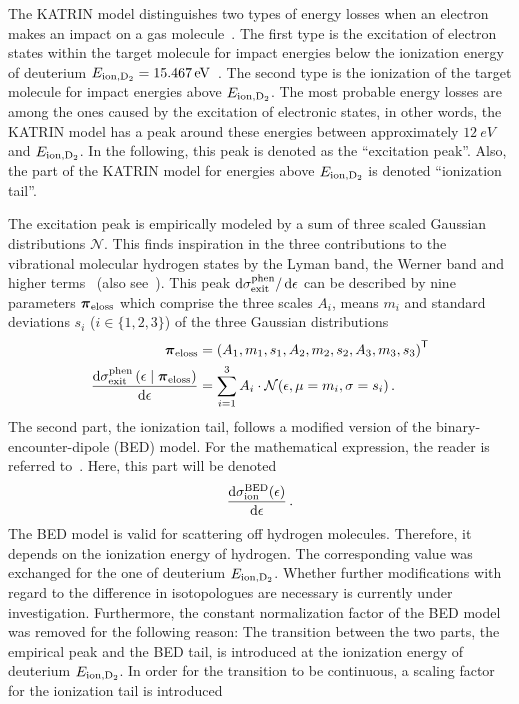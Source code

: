 The KATRIN model distinguishes two types of energy losses when an electron makes an impact on a gas molecule~\cite{Hannen2019_2}. The first type is the excitation of electron states within the target molecule for impact energies below the ionization energy of deuterium $E_\mathrm{ion,D_2}=\SI{15.467}{eV}$~\cite{Shiner1993}. The second type is the ionization of the target molecule for impact energies above $E_\mathrm{ion,D_2}$. The most probable energy losses are among the ones caused by the excitation of electronic states, in other words, the KATRIN model has a peak around these energies between approximately $\SI{12}{eV}$ and $E_\mathrm{ion,D_2}$. In the following, this peak is denoted as the ``excitation peak''. Also, the part of the KATRIN model for energies above $E_\mathrm{ion,D_2}$ is denoted ``ionization tail''.

The excitation peak is empirically modeled by a sum of three scaled Gaussian distributions $\mathcal{N}$. This finds inspiration in the three contributions to the vibrational molecular hydrogen states by the Lyman band, the Werner band and higher terms~\cite{Hannen2019_1} (also see~\cite{Geiger1964}). This peak $\mathop{}\!\mathrm{d}\sigma_\mathrm{exit}^\mathrm{phen}/\mathop{}\!\mathrm{d} \epsilon$  can be described by nine parameters $\boldsymbol{\mathbf{\pi}}_\mathrm{eloss}$ which comprise the three scales $A_i$, means $m_i$ and standard deviations $s_i$ ($i \in \{1,2,3\}$) of the three Gaussian distributions~\cite{Hannen2019_2}
\newcommand{\katrinElossPhen}[1]{
	\frac{
		\d\sigma_\mathrm{exit}^\mathrm{phen}\giventhat*{#1}{\nuisanceParamVec_\mathrm{eloss}}
	}{
		\d \epsilon
	}
}
\begin{align}
\label{eq:katrinElossElossModelParams}
\nuisanceParamVec_\mathrm{eloss} &= 
\transp{\left(
	A_1, m_1, s_1, 
	A_2, m_2, s_2, 
	A_3, m_3, s_3
	\right)} \\
\katrinElossPhen{\epsilon} &=
\sum_{i=1}^3 A_i \cdot \mathcal{N}(\epsilon, \mu=m_i, \sigma=s_i)
\fullstop
\end{align}
The second part, the ionization tail, follows a modified version of the binary-encounter-dipole (BED) model. For the mathematical expression, the reader is referred to~\cite{Kim1994}. Here, this part will be denoted
\newcommand{\katrinElossBDE}[1]{
	\frac{
		\d \sigma_\mathrm{ion}^\mathrm{BED}(#1)
	}{
		\d \epsilon
	}
}%
\begin{equation}
	\katrinElossBDE{\epsilon}
	\fullstop
\end{equation}%
The BED model is valid for scattering off hydrogen molecules. Therefore, it depends on the ionization energy of hydrogen. The corresponding value was exchanged for the one of deuterium $E_\mathrm{ion,D_2}$. Whether further modifications with regard to the difference in isotopologues are necessary is currently under investigation. Furthermore, the constant normalization factor of the BED model was removed for the following reason: The transition between the two parts, the empirical peak and the BED tail, is introduced at the ionization energy of deuterium $E_\mathrm{ion,D_2}$. In order for the transition to be continuous, a scaling factor for the ionization tail is introduced
